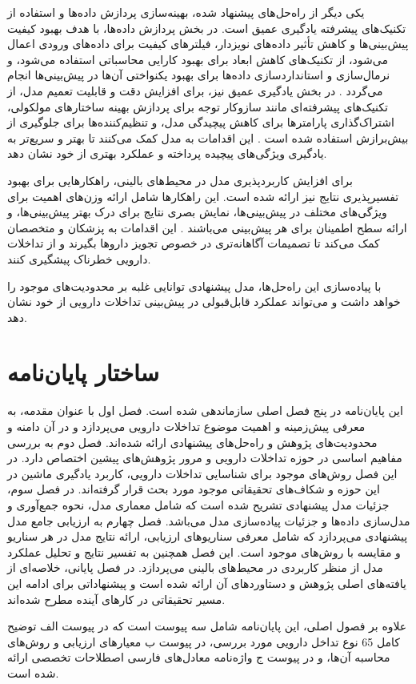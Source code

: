 یکی دیگر از راه‌حل‌های پیشنهاد شده، بهینه‌سازی پردازش داده‌ها و استفاده از تکنیک‌های پیشرفته یادگیری عمیق است. در بخش پردازش داده‌ها، با هدف بهبود کیفیت پیش‌بینی‌ها و کاهش تأثیر داده‌های نویزدار، فیلترهای کیفیت برای داده‌های ورودی اعمال می‌شود، از تکنیک‌های کاهش ابعاد برای بهبود کارایی محاسباتی استفاده می‌شود، و نرمال‌سازی و استانداردسازی داده‌ها برای بهبود یکنواختی آن‌ها در پیش‌بینی‌ها انجام می‌گردد \cite{ref_he2023}. در بخش یادگیری عمیق نیز، برای افزایش دقت و قابلیت تعمیم مدل، از تکنیک‌های پیشرفته‌ای مانند سازوکار توجه برای پردازش بهینه ساختارهای مولکولی، اشتراک‌گذاری پارامترها برای کاهش پیچیدگی مدل، و تنظیم‌کننده‌ها برای جلوگیری از بیش‌برازش استفاده شده است \cite{ref_li2023}. این اقدامات به مدل کمک می‌کنند تا بهتر و سریع‌تر به یادگیری ویژگی‌های پیچیده پرداخته و عملکرد بهتری از خود نشان دهد.

برای افزایش کاربردپذیری مدل در محیط‌های بالینی، راهکارهایی برای بهبود تفسیرپذیری نتایج نیز ارائه شده است. این راهکارها شامل ارائه وزن‌های اهمیت برای ویژگی‌های مختلف در پیش‌بینی‌ها، نمایش بصری نتایج برای درک بهتر پیش‌بینی‌ها، و ارائه سطح اطمینان برای هر پیش‌بینی می‌باشند \cite{ref_shi2024}. این اقدامات به پزشکان و متخصصان کمک می‌کند تا تصمیمات آگاهانه‌تری در خصوص تجویز داروها بگیرند و از تداخلات دارویی خطرناک پیشگیری کنند.

با پیاده‌سازی این راه‌حل‌ها، مدل پیشنهادی توانایی غلبه بر محدودیت‌های موجود را خواهد داشت و می‌تواند عملکرد قابل‌قبولی در پیش‌بینی تداخلات دارویی از خود نشان دهد.

\section{ساختار پایان‌نامه}

این پایان‌نامه در پنج فصل اصلی سازماندهی شده است. فصل اول با عنوان مقدمه، به معرفی پیش‌زمینه و اهمیت موضوع تداخلات دارویی می‌پردازد و در آن دامنه و محدودیت‌های پژوهش و راه‌حل‌های پیشنهادی ارائه شده‌اند. فصل دوم به بررسی مفاهیم اساسی در حوزه تداخلات دارویی و مرور پژوهش‌های پیشین اختصاص دارد. در این فصل روش‌های موجود برای شناسایی تداخلات دارویی، کاربرد یادگیری ماشین در این حوزه و شکاف‌های تحقیقاتی موجود مورد بحث قرار گرفته‌اند. در فصل سوم، جزئیات مدل پیشنهادی تشریح شده است که شامل معماری مدل، نحوه جمع‌آوری و مدل‌سازی داده‌ها و جزئیات پیاده‌سازی مدل می‌باشد. فصل چهارم به ارزیابی جامع مدل پیشنهادی می‌پردازد که شامل معرفی سناریوهای ارزیابی، ارائه نتایج مدل در هر سناریو و مقایسه با روش‌های موجود است. این فصل همچنین به تفسیر نتایج و تحلیل عملکرد مدل از منظر کاربردی در محیط‌های بالینی می‌پردازد. در فصل پایانی، خلاصه‌ای از یافته‌های اصلی پژوهش و دستاوردهای آن ارائه شده است و پیشنهاداتی برای ادامه این مسیر تحقیقاتی در کارهای آینده مطرح شده‌اند.

علاوه بر فصول اصلی، این پایان‌نامه شامل سه پیوست است که در پیوست الف توضیح کامل 65 نوع تداخل دارویی مورد بررسی، در پیوست ب معیارهای ارزیابی و روش‌های محاسبه آن‌ها، و در پیوست ج واژه‌نامه معادل‌های فارسی اصطلاحات تخصصی ارائه شده است.

